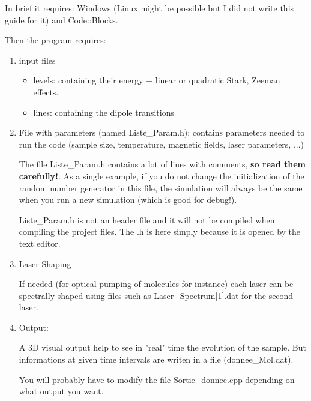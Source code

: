 \documentclass[amsmath,amssymb,nofootinbib]{revtex4-2}
\begin{document}

In brief it requires: Windows (Linux might be possible but I did not write this guide for it) and Code::Blocks. 

Then the program requires:



\begin{enumerate}
	\item 	input files
	

\begin{itemize}
	\item 			levels: containing their energy + linear or quadratic Stark, Zeeman effects.
		\item 	lines: containing the dipole transitions 
		
		
\end{itemize}

\item File with parameters (named Liste\_Param.h): contains parameters needed to run the code (sample size, temperature, magnetic fields, laser parameters, ...)
	 
	The file Liste\_Param.h contains a lot of lines with comments, \textbf{so read them carefully!}. As a single example, if you do not change the initialization of the random number generator in this file, the simulation will always be the same when you run a new simulation (which is good for debug!).
	
Liste\_Param.h  is not an header file and it will not be compiled when compiling the project files. The .h is here simply because it is opened by the text editor. 


					
					\item Laser Shaping
					
				If needed (for optical pumping of molecules for instance)	
			 each laser  can be spectrally shaped using files such as Laser\_Spectrum[1].dat for the second laser. 
					
					\item Output: 
					
					A 3D visual output help to see in "real" time the evolution of the sample. But informations at given time intervals are writen in a file (donnee\_Mol.dat).
					
				
 You will probably have to modify the file Sortie\_donnee.cpp depending on what output you want. 
			


\end{enumerate}
\end{document}
